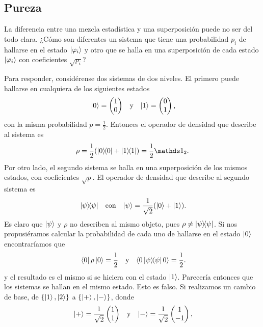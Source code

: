 \subsection{Pureza}

La diferencia entre una mezcla estadística y una superposición puede no ser del todo clara. ¿Cómo son diferentes un sistema que tiene una probabilidad $p_{i}$ de hallarse en el estado $\ket{\varphi_{i}}$ y otro que se halla en una superposición de cada estado $\ket{\varphi_{i}}$ con coeficientes $\sqrt{p_{i}}$? 

Para responder, considérense dos sistemas de dos niveles. El primero puede hallarse en cualquiera de los siguientes estados
\begin{align}
    \ket{0}=\begin{pmatrix}
        1\\
        0
    \end{pmatrix} && \text{y} && \ket{1}=\begin{pmatrix}
        0\\
        1
    \end{pmatrix}\rlap{,}\nonumber
\end{align}
con la misma probabilidad $p=\frac{1}{2}$. Entonces el operador de densidad que describe al sistema es 
\begin{equation}
    \rho=\frac{1}{2}(\dyad{0}+\dyad{1})=\frac{1}{2}\Id_{2}.\nonumber
\end{equation}
Por otro lado, el segundo sistema se halla en una superposición de los mismos estados, con coeficientes $\sqrt{p}$. El operador de densidad que describe al segundo sistema es 
\begin{align}
    \dyad{\psi} && \text{con} && \ket{\psi}=\frac{1}{\sqrt{2}}(\ket{0}+\ket{1})\rlap{.}\nonumber
\end{align}
Es claro que $\ket{\psi}$ y $\rho$ no describen al mismo objeto, pues $\rho\neq\dyad{\psi}$. Si nos propusiéramos calcular la probabilidad de cada uno de hallarse en el estado $\ket{0}$ encontraríamos que
\begin{align}
    \bra{0}\rho\ket{0}=\frac{1}{2} && \text{y} &&\langle 0 \dyad{\psi} 0\rangle=\frac{1}{2}\rlap{.}\nonumber
\end{align}
y el resultado es el mismo si se hiciera con el estado $\ket{1}$. Parecería entonces que los sistemas se hallan en el mismo estado. Esto es falso. Si realizamos un cambio de base, de $\{\ket{1},\ket{2}\}$ a $\{\ket{+},\ket{-}\}$, donde
\begin{align}
    \ket{+}=\frac{1}{\sqrt{2}}\begin{pmatrix}
        1\\
        1
    \end{pmatrix} && \text{y} && \ket{-}=\frac{1}{\sqrt{2}}\begin{pmatrix}
        1\\
        -1
    \end{pmatrix}\rlap{,}\nonumber
\end{align}
